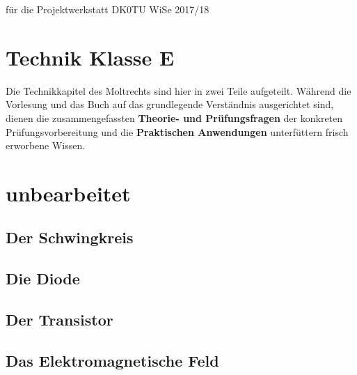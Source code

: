 \documentclass[ngerman, openany, twoside]{Script}
\begin{document}

%
	{für die Projektwerkstatt DK0TU}%
	{WiSe 2017/18}%

\newpage

\newpage
\tableofcontents
\newpage



\part{Technik Klasse E}

    Die Technikkapitel des Moltrechts sind hier in zwei Teile aufgeteilt.
    Während die Vorlesung und das Buch auf das grundlegende Verständnis
    ausgerichtet sind, dienen die zusammengefassten \textbf{Theorie- und
    Prüfungsfragen} der konkreten Prüfungsvorbereitung und die
    \textbf{Praktischen Anwendungen} unterfüttern frisch erworbene Wissen.

\clearpage




\part{unbearbeitet}



\chapter{Der Schwingkreis}


\chapter{Die Diode}


\chapter{Der Transistor}


\newpage \vspace*{5cm}
\newpage

\chapter{Das Elektromagnetische Feld}

\end{document}
